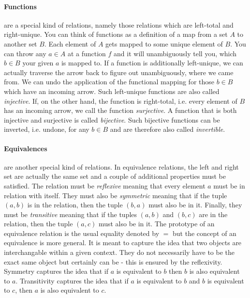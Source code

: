 
\paragraph{Functions} are a special kind of relations, namely those relations which are left-total and right-unique. You can think of functions as a definition of a map from a set $A$ to another set $B$. Each element of $A$ gets mapped to some unique element of $B$. You can throw any $a \in A$ at a function $f$ and it will unambiguously tell you, which $b \in B$ your given $a$ is mapped to. If a function is additionally left-unique, we can actually traverse the arrow back to figure out unambiguously, where we came from. We can undo the application of the functional mapping for those $b \in B$ which have an incoming arrow. Such left-unique functions are also called \emph{injective}. If, on the other hand, the function is right-total, i.e. every element of $B$ has an incoming arrow, we call the function \emph{surjective}. A function that is both injective and surjective is called \emph{bijective}. Such bijective functions can be inverted, i.e. undone, for any $b \in B$ and are therefore also called \emph{invertible}.


\paragraph{Equivalences} are another special kind of relations. In equivalence relations, the left and right set are actually the same set and a couple of additional properties must be satisfied. The relation must be \emph{reflexive} meaning that every element $a$ must be in relation with itself. They must also be \emph{symmetric} meaning that if the tuple $(a,b)$ is in the relation, then the tuple $(b,a)$ must also be in it. Finally, they must be \emph{transitive} meaning that if the tuples $(a,b)$ and $(b,c)$ are in the relation, then the tuple $(a,c)$ must also be in it. The prototype of an equivalence relation is the usual equality denoted by $=$ but the concept of an equivalence is more general. It is meant to capture the idea that two objects are interchangable within a given context. They do not necessarily have to be the exact same object but certainly can be - this is ensured by the reflexivity. Symmetry captures the idea that if $a$ is equivalent to $b$ then $b$ is also equivalent to $a$. Transitivity captures the idea that if $a$ is equivalent to $b$ and $b$ is equivalent to $c$, then $a$ is also equivalent to $c$.


